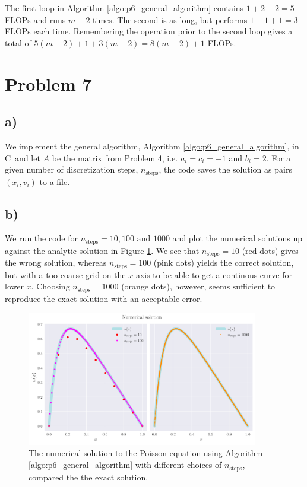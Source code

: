 \documentclass[english,notitlepage,nofootinbib]{revtex4-1}  %
\newcommand{\Fig}[1]{Figure \ref{fig:#1}}
\newcommand{\Algo}[1]{Algorithm \ref{algo:#1}}
\newcommand{\CC}{C\nolinebreak\hspace{-.05em}\raisebox{.4ex}{\tiny\bf +}\nolinebreak\hspace{-.10em}\raisebox{.4ex}{\tiny\bf +}}
\begin{document}
The first loop in \Algo{p6_general_algorithm} contains $1+2+2=5$ FLOPs and runs $m-2$ times. The second is as long, but performs $1+1+1=3$ FLOPs each time. Remembering the operation prior to the second loop gives a total of $5(m-2)+1+3(m-2)=8(m-2)+1$ FLOPs.


\section*{Problem 7}

\subsection*{a)}

We implement the general algorithm, \Algo{p6_general_algorithm}, in \CC\, and let $A$ be the matrix from Problem 4, i.e. $a_i=c_i=-1$ and $b_i=2$. For a given number of discretization steps, $n_\text{steps}$, the code saves the solution as pairs $(x_i, v_i)$ to a file.


\subsection*{b)}

We run the code for $n_\text{steps}=10, 100 \text{ and } 1000$ and plot the numerical solutions up against the analytic solution in \Fig{p7_num_sol}. We see that $n_\text{steps}=10$ (red dots) gives the wrong solution, whereas $n_\text{steps}=100$ (pink dots) yields the correct solution, but with a too coarse grid on the $x$-axis to be able to get a continous curve for lower $x$. Choosing $n_\text{steps}=1000$ (orange dots), however, seems sufficient to reproduce the exact solution with an acceptable error.

\begin{figure}[h!]
    \centering
    \includegraphics[width=0.9\textwidth]{comparison_p7.pdf}
    \caption{The numerical solution to the Poisson equation using \Algo{p6_general_algorithm} with different choices of $n_\text{steps}$, compared the the exact solution.}\label{fig:p7_num_sol}
\end{figure}
\end{document}
